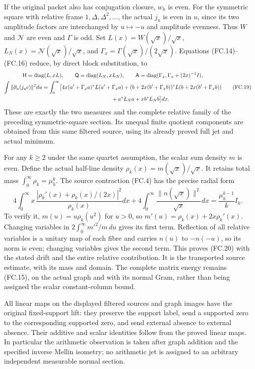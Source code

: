 If the original packet also has conjugation closure, \(w_h\) is even.
For the symmetric square with relative frame \(1,\Delta,\Delta^2,\ldots\),
the actual \(j_u\) is even in \(u\), since its two amplitude
factors are interchanged by \(u\mapsto-u\) and amplitude evenness.
Thus \(W\) and \(\mathcal N\) are even and \(\Gamma\) is odd.
Set \(L(x)=W(\sqrt x)/\sqrt x\),
\(L_N(x)=\mathcal N(\sqrt x)/\sqrt x\), and
\(\Gamma_x=\Gamma(\sqrt x)/(2\sqrt x)\). Equations (FC.14)--(FC.16)
reduce, by direct block substitution, to
\[
 \begin{gathered}
 \mathsf H=\operatorname{diag}(L,xL),\qquad
 \mathsf Q=\operatorname{diag}(L_N,xL_N),\qquad
 \mathsf A=\operatorname{diag}(\Gamma_x,\Gamma_x+(2x)^{-1}I),\\
 \int\|\partial_u(j_uc)\|^2du
 =\int_0^\infty\bigl[
 4x(a'+\Gamma_xa)^*L(a'+\Gamma_xa)
 +(b+2x(b'+\Gamma_xb))^*L(b+2x(b'+\Gamma_xb))\\
 \hspace{35mm}{}+a^*L_Na+x b^*L_Nb\bigr]dx.
 \end{gathered}
 \tag{FC.19}
\]
These are exactly the two measures and the complete relative family
of the preceding symmetric-square section. Its unequal finite
quotient components are obtained from this same filtered source,
using its already proved full jet and actual minimum.

For any \(k\ge2\) under the same quartet assumption, the scalar sum
density \(m\) is even. Define the actual half-line density
\(\rho_k(x)=m(\sqrt x)/\sqrt x\). It retains total mass
\(\int_0^\infty\rho_k=\mu_h^k\). The source contraction (FC.4)
has the precise radial form
\[
 \boxed{
 4\int_0^\infty x\,
       \frac{|\rho_k'(x)+\rho_k(x)/(2x)|^2}{\rho_k(x)}dx
 +4\int_0^\infty\frac{\|n(\sqrt x)\|^2}{\sqrt x}dx
                =\frac{\mu_h^{k-1}}k I_h.}
 \tag{FC.20}
\]
To verify it, \(m(u)=u\rho_k(u^2)\) for \(u>0\), so
\(m'(u)=\rho_k(x)+2x\rho_k'(x)\). Changing variables in
\(2\int_0^\infty m'^2/m\,du\) gives its first term.
Reflection of all relative variables is a unitary map of each
fibre and carries \(n(u)\) to \(-n(-u)\), so its norm is even;
changing variables gives the second term. This proves (FC.20)
with the stated drift and the entire relative contribution.
It is the transported source estimate, with its mass and domain.
The complete matrix energy remains (FC.15), on the actual graph
and with its normal Gram, rather than being assigned the scalar
constant-column bound.

All linear maps on the displayed filtered sources and graph images
have the original fixed-support lift: they preserve the support
label, send a supported zero to the corresponding supported zero,
and send external absence to external absence. Their additive and
scalar identities follow from the proved linear maps. In particular
the arithmetic observation is taken after graph addition and the
specified inverse Mellin isometry; no arithmetic jet is assigned
to an arbitrary independent measurable normal section.


